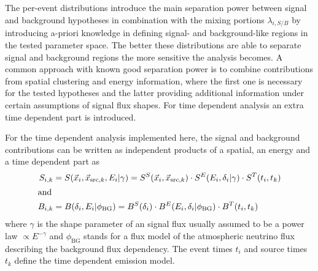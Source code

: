 The per-event distributions introduce the main separation power between signal and background hypotheses in combination with the mixing portions $\lambda_{i,S/B}$ by introducing a-priori knowledge in defining signal- and background-like regions in the tested parameter space.
The better these distributions are able to separate signal and background regions the more sensitive the analysis becomes.
A common approach with known good separation power is to combine contributions from spatial clustering and energy information, where the first one is necessary for the tested hypotheses and the latter providing additional information under certain assumptions of signal flux shapes.
For time dependent analysis an extra time dependent part is introduced.

For the time dependent analysis implemented here, the signal and background contributions can be written as independent products of a spatial, an energy and a time dependent part as
\begin{align}
  S_{i,k}
    &= S(\vec{x}_i, \vec{x}_{\mathrm{src},k}, E_i | \gamma)
     = S^S(\vec{x}_i, \vec{x}_{\mathrm{src},k}) \cdot
       S^E(E_i, \delta_i | \gamma) \cdot
       S^T(t_i, t_k) \\
  \intertext{and}
  B_{i,k}
    &= B(\delta_i, E_i | \phi_\mathrm{BG})
     = B^S(\delta_i) \cdot
       B^E(E_i, \delta_i | \phi_\mathrm{BG}) \cdot
       B^T(t_i, t_k)
\end{align}
where $\gamma$ is the shape parameter of an signal flux usually assumed to be a power law $\propto E^{-\gamma}$ and $\phi_\mathrm{BG}$ stands for a flux model of the atmospheric neutrino flux describing the background flux dependency.
The event times $t_i$ and source times $t_k$ define the time dependent emission model.

